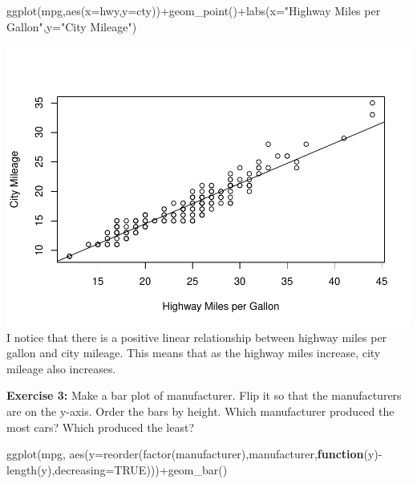 \documentclass[
]{article}
\newenvironment{Shaded}{\begin{snugshade}}{\end{snugshade}}
\newcommand{\AttributeTok}[1]{\textcolor[rgb]{0.77,0.63,0.00}{#1}}
\newcommand{\ConstantTok}[1]{\textcolor[rgb]{0.00,0.00,0.00}{#1}}
\newcommand{\ControlFlowTok}[1]{\textcolor[rgb]{0.13,0.29,0.53}{\textbf{#1}}}
\newcommand{\FunctionTok}[1]{\textcolor[rgb]{0.00,0.00,0.00}{#1}}
\newcommand{\NormalTok}[1]{#1}
\newcommand{\SpecialCharTok}[1]{\textcolor[rgb]{0.00,0.00,0.00}{#1}}
\newcommand{\StringTok}[1]{\textcolor[rgb]{0.31,0.60,0.02}{#1}}
\begin{document}
\begin{Shaded}
\begin{Highlighting}[]
\FunctionTok{ggplot}\NormalTok{(mpg,}\FunctionTok{aes}\NormalTok{(}\AttributeTok{x=}\NormalTok{hwy,}\AttributeTok{y=}\NormalTok{cty))}\SpecialCharTok{+}\FunctionTok{geom\_point}\NormalTok{()}\SpecialCharTok{+}\FunctionTok{labs}\NormalTok{(}\AttributeTok{x=}\StringTok{"Highway Miles per Gallon"}\NormalTok{,}\AttributeTok{y=}\StringTok{"City Mileage"}\NormalTok{)}
\end{Highlighting}
\end{Shaded}

\includegraphics{PSTAT131-HW1_files/figure-latex/unnamed-chunk-2-1.pdf}
I notice that there is a positive linear relationship between highway
miles per gallon and city mileage. This means that as the highway miles
increase, city mileage also increases.

\textbf{Exercise 3:} Make a bar plot of manufacturer. Flip it so that
the manufacturers are on the y-axis. Order the bars by height. Which
manufacturer produced the most cars? Which produced the least?

\begin{Shaded}
\begin{Highlighting}[]
\FunctionTok{ggplot}\NormalTok{(mpg, }\FunctionTok{aes}\NormalTok{(}\AttributeTok{y=}\FunctionTok{reorder}\NormalTok{(}\FunctionTok{factor}\NormalTok{(manufacturer),manufacturer,}\ControlFlowTok{function}\NormalTok{(y)}\SpecialCharTok{{-}}\FunctionTok{length}\NormalTok{(y),}\AttributeTok{decreasing=}\ConstantTok{TRUE}\NormalTok{)))}\SpecialCharTok{+}\FunctionTok{geom\_bar}\NormalTok{() }
\end{Highlighting}
\end{Shaded}
\end{document}
